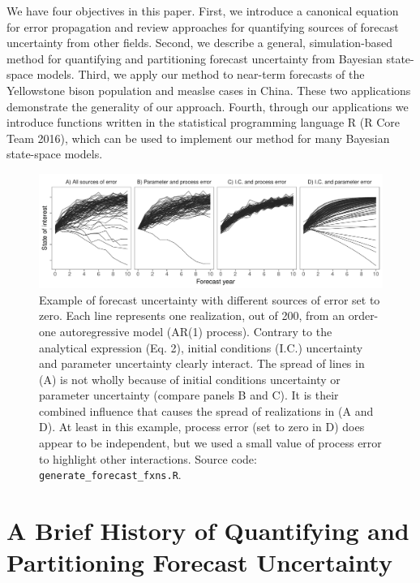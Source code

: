 \documentclass[12pt,]{article}
\begin{document}
We have four objectives in this paper. First, we introduce a canonical
equation for error propagation and review approaches for quantifying
sources of forecast uncertainty from other fields. Second, we describe a
general, simulation-based method for quantifying and partitioning
forecast uncertainty from Bayesian state-space models. Third, we apply
our method to near-term forecasts of the Yellowstone bison population
and measlse cases in China. These two applications demonstrate the
generality of our approach. Fourth, through our applications we
introduce functions written in the statistical programming language R (R
Core Team 2016), which can be used to implement our method for many
Bayesian state-space models.

\begin{figure}
\centering
\includegraphics{../figures/forecast_uncertainty_example.pdf}
\caption{Example of forecast uncertainty with different sources of error
set to zero. Each line represents one realization, out of 200, from an
order-one autoregressive model (AR(1) process). Contrary to the
analytical expression (Eq. 2), initial conditions (I.C.) uncertainty and
parameter uncertainty clearly interact. The spread of lines in (A) is
not wholly because of initial conditions uncertainty or parameter
uncertainty (compare panels B and C). It is their combined influence
that causes the spread of realizations in (A and D). At least in this
example, process error (set to zero in D) does appear to be independent,
but we used a small value of process error to highlight other
interactions. Source code: \texttt{generate\_forecast\_fxns.R}.}
\end{figure}

\hypertarget{a-brief-history-of-quantifying-and-partitioning-forecast-uncertainty}{%
\section{A Brief History of Quantifying and Partitioning Forecast
Uncertainty}\label{a-brief-history-of-quantifying-and-partitioning-forecast-uncertainty}}
\end{document}
